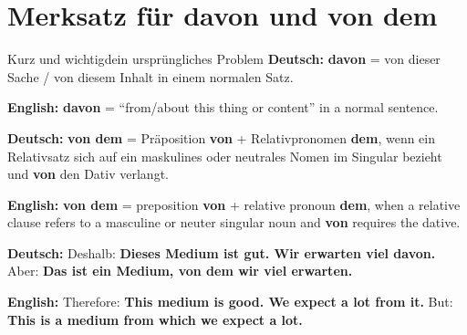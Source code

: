 \documentclass[a4paper,11pt]{article}
\newcommand{\GermanText}[1]{\textbf{Deutsch: }#1\par}
\newcommand{\EnglishText}[1]{{\small\color{SoftGray}\textbf{English: }#1\par}}
\begin{document}
    \section{Merksatz für \glqq davon\grqq{} und \glqq von dem\grqq{}}

        \begin{grammarentry}{Kurz und wichtig}{dein ursprüngliches Problem}
            \GermanText{\textbf{davon} = \glqq von dieser Sache / von diesem Inhalt\grqq{} in einem normalen Satz.}
            \EnglishText{\textbf{davon} = ``from/about this thing or content'' in a normal sentence.}

            \GermanText{\textbf{von dem} = Präposition \textbf{von} + Relativpronomen \textbf{dem}, wenn ein Relativsatz sich auf ein maskulines oder neutrales Nomen im Singular bezieht und \textbf{von} den Dativ verlangt.}
            \EnglishText{\textbf{von dem} = preposition \textbf{von} + relative pronoun \textbf{dem}, when a relative clause refers to a masculine or neuter singular noun and \textbf{von} requires the dative.}

            \GermanText{Deshalb: \textbf{Dieses Medium ist gut. Wir erwarten viel davon.} Aber: \textbf{Das ist ein Medium, von dem wir viel erwarten.}}
            \EnglishText{Therefore: \textbf{This medium is good. We expect a lot from it.} But: \textbf{This is a medium from which we expect a lot.}}
        \end{grammarentry}
\end{document}
